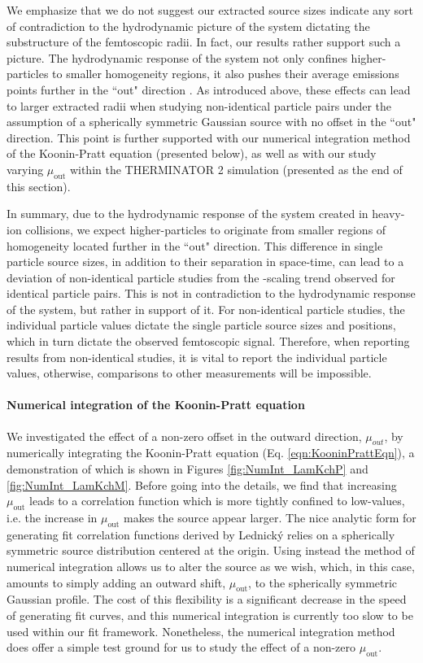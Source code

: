 \documentclass[/home/jesse/Analysis/FemtoAnalysis/AnalysisNotes/AnalysisNoteJBuxton.tex]{subfiles}
\begin{document}
We emphasize that we do not suggest our extracted source sizes indicate any sort of contradiction to the hydrodynamic picture of the system dictating the substructure of the femtoscopic radii.
In fact, our results rather support such a picture.
The hydrodynamic response of the system not only confines higher-\mt particles to smaller homogeneity regions, it also pushes their average emissions points further in the ``out" direction \cite{Retiere:2003kf}.
As introduced above, these effects can lead to larger extracted radii when studying non-identical particle pairs under the assumption of a spherically symmetric Gaussian source with no offset in the ``out" direction.
This point is further supported with our numerical integration method of the Koonin-Pratt equation (presented below), as well as with our study varying $\mu_{\mathrm{out}}$ within the THERMINATOR 2 simulation (presented as the end of this section).

In summary, due to the hydrodynamic response of the system created in heavy-ion collisions, we expect higher-\mt particles to originate from smaller regions of homogeneity located further in the ``out" direction.
This difference in single particle source sizes, in addition to their separation in space-time, can lead to a deviation of non-identical particle studies from the \mt-scaling trend observed for identical particle pairs.
This is not in contradiction to the hydrodynamic response of the system, but rather in support of it.
For non-identical particle studies, the individual particle \mt values dictate the single particle source sizes and positions, which in turn dictate the observed femtoscopic signal.
Therefore, when reporting results from non-identical studies, it is vital to report the individual particle \mt values, otherwise, comparisons to other measurements will be impossible.


\paragraph*{Numerical integration of the Koonin-Pratt equation}
We investigated the effect of a non-zero offset in the outward direction, $\mu_{out}$, by numerically integrating the Koonin-Pratt equation (Eq. \ref{eqn:KooninPrattEqn}), a demonstration of which is shown in Figures \ref{fig:NumInt_LamKchP} and \ref{fig:NumInt_LamKchM}.
Before going into the details, we find that increasing $\mu_{\mathrm{out}}$ leads to a correlation function which is more tightly confined to low-\kstar values, i.e. the increase in $\mu_{\mathrm{out}}$ makes the source appear larger.
The nice analytic form for generating fit correlation functions derived by Lednick\'y relies on a spherically symmetric source distribution centered at the origin.
Using instead the method of numerical integration allows us to alter the source as we wish, which, in this case, amounts to simply adding an outward shift, $\mu_{\mathrm{out}}$, to the spherically symmetric Gaussian profile.
The cost of this flexibility is a significant decrease in the speed of generating fit curves, and this numerical integration is currently too slow to be used within our fit framework.
Nonetheless, the numerical integration method does offer a simple test ground for us to study the effect of a non-zero $\mu_{\mathrm{out}}$.
\end{document}
